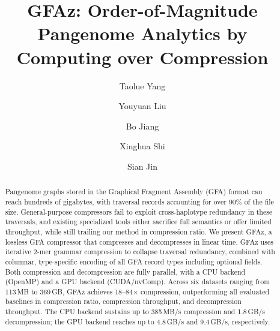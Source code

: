 \documentclass[sigconf]{acmart}
\newcommand{\gfaz}{GFAz\xspace}
\begin{document}
\title{\gfaz: Order-of-Magnitude Pangenome Analytics by Computing over Compression}

\author{Taolue Yang}

\author{Youyuan Liu}

\author{Bo Jiang}

\author{Xinghua Shi}

\author{Sian Jin}



\begin{abstract}
  Pangenome graphs stored in the Graphical Fragment Assembly (GFA) format can reach hundreds of gigabytes, with traversal records accounting for over 90\% of the file size. General-purpose compressors fail to exploit cross-haplotype redundancy in these traversals, and existing specialized tools either sacrifice full semantics or offer limited throughput, while still trailing our method in compression ratio.
  We present \gfaz, a lossless GFA compressor that compresses and decompresses in linear time. \gfaz uses iterative 2-mer grammar compression to collapse traversal redundancy, combined with columnar, type-specific encoding of all GFA record types including optional fields. Both compression and decompression are fully parallel, with a CPU backend (OpenMP) and a GPU backend (CUDA/nvComp). Across six datasets ranging from 113\,MB to 369\,GB, \gfaz achieves 18--84$\times$ compression, outperforming all evaluated baselines in compression ratio, compression throughput, and decompression throughput. The CPU backend sustains up to 385\,MB/s compression and 1.8\,GB/s decompression; the GPU backend reaches up to 4.8\,GB/s and 9.4\,GB/s, respectively.
\end{abstract}
\end{document}
